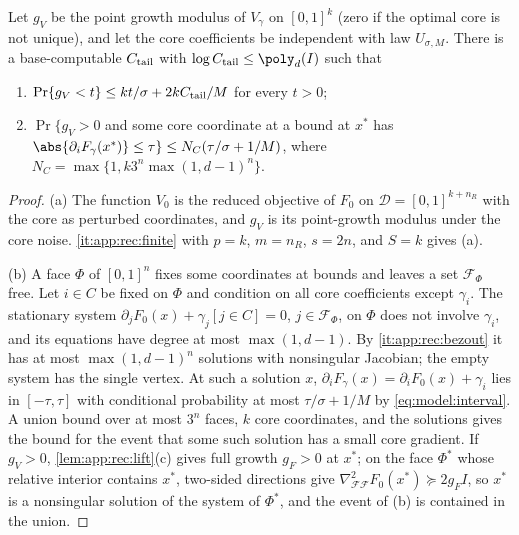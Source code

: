 \begin{lemma}\label{lem:app:rec:core-tails}
Let $g_V$ be the point growth modulus of $V_\gamma$ on $[0,1]^k$ (zero if the
optimal core is not unique), and let the core coefficients be independent with
law $U_{\sigma,M}$. There is a base-computable $C_{\rm tail}$ with
$\log C_{\rm tail}\le\poly_d(I)$ such that
\begin{enumerate}[label=(\alph*)]
\item $\Pr\{g_V<t\}\le kt/\sigma+2kC_{\rm tail}/M$ for every $t>0$;
\item $\Pr\{g_V>0$ and some core coordinate at a bound at $x^*$ has
$\abs{\partial_iF_\gamma(x^*)}\le\tau\}\le N_C(\tau/\sigma+1/M)$, where
$N_C=\max\{1,k3^n\max(1,d-1)^n\}$.
\end{enumerate}
\end{lemma}

\begin{proof}
(a) The function $V_0$ is the reduced objective of $F_0$ on
$\mathcal D=[0,1]^{k+n_R}$ with the core as perturbed coordinates, and $g_V$ is
its point-growth modulus under the core noise. \ref{it:app:rec:finite} with
$p=k$, $m=n_R$, $s=2n$, and $S=k$ gives (a).

(b) A face $\Phi$ of $[0,1]^n$ fixes some coordinates at bounds and leaves a set
$\mathcal F_\Phi$ free. Let $i\in C$ be fixed on $\Phi$ and condition on all
core coefficients except $\gamma_i$. The stationary system
$\partial_jF_0(x)+\gamma_j[j\in C]=0$, $j\in\mathcal F_\Phi$, on $\Phi$ does not
involve $\gamma_i$, and its equations have degree at most $\max(1,d-1)$. By
\ref{it:app:rec:bezout} it has at most $\max(1,d-1)^n$ solutions with
nonsingular Jacobian; the empty system has the single vertex. At such a
solution $x$, $\partial_iF_\gamma(x)=\partial_iF_0(x)+\gamma_i$ lies in
$[-\tau,\tau]$ with conditional probability at most $\tau/\sigma+1/M$ by
\eqref{eq:model:interval}. A union bound over at most $3^n$ faces, $k$ core
coordinates, and the solutions gives the bound for the event that some such
solution has a small core gradient. If $g_V>0$, \cref{lem:app:rec:lift}(c)
gives full growth $g_F>0$ at $x^*$; on the face $\Phi^*$ whose relative
interior contains $x^*$, two-sided directions give
$\nabla^2_{\mathcal F\mathcal F}F_0(x^*)\succeq2g_FI$, so $x^*$ is a
nonsingular solution of the system of $\Phi^*$, and the event of (b) is
contained in the union.
\end{proof}

